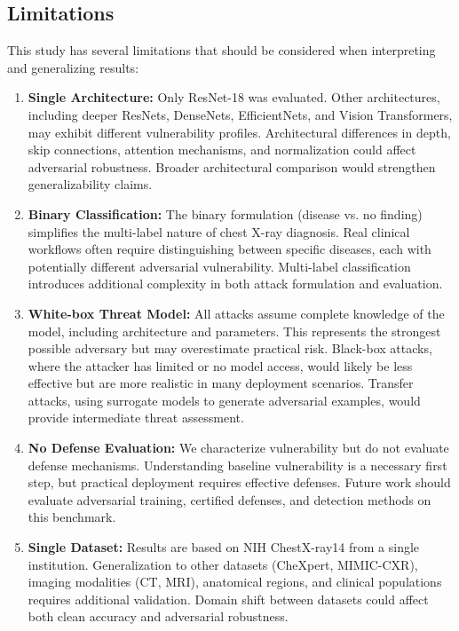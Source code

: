 \documentclass[12pt,a4paper]{article}
\begin{document}
\subsection{Limitations}

This study has several limitations that should be considered when interpreting and generalizing results:

\begin{enumerate}[leftmargin=*]
    \item \textbf{Single Architecture:} Only ResNet-18 was evaluated. Other architectures, including deeper ResNets, DenseNets, EfficientNets, and Vision Transformers, may exhibit different vulnerability profiles. Architectural differences in depth, skip connections, attention mechanisms, and normalization could affect adversarial robustness. Broader architectural comparison would strengthen generalizability claims.
    
    \item \textbf{Binary Classification:} The binary formulation (disease vs. no finding) simplifies the multi-label nature of chest X-ray diagnosis. Real clinical workflows often require distinguishing between specific diseases, each with potentially different adversarial vulnerability. Multi-label classification introduces additional complexity in both attack formulation and evaluation.
    
    \item \textbf{White-box Threat Model:} All attacks assume complete knowledge of the model, including architecture and parameters. This represents the strongest possible adversary but may overestimate practical risk. Black-box attacks, where the attacker has limited or no model access, would likely be less effective but are more realistic in many deployment scenarios. Transfer attacks, using surrogate models to generate adversarial examples, would provide intermediate threat assessment.
    
    \item \textbf{No Defense Evaluation:} We characterize vulnerability but do not evaluate defense mechanisms. Understanding baseline vulnerability is a necessary first step, but practical deployment requires effective defenses. Future work should evaluate adversarial training, certified defenses, and detection methods on this benchmark.
    
    \item \textbf{Single Dataset:} Results are based on NIH ChestX-ray14 from a single institution. Generalization to other datasets (CheXpert, MIMIC-CXR), imaging modalities (CT, MRI), anatomical regions, and clinical populations requires additional validation. Domain shift between datasets could affect both clean accuracy and adversarial robustness.
    

\end{enumerate}
\end{document}
